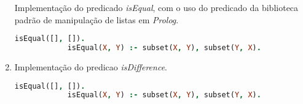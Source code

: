 \documentclass{article}
\begin{document}
\begin{enumerate}
        Implementação do predicado \textit{isEqual}, com o uso do predicado da biblioteca padrão de manipulação
        de listas em \textit{Prolog}.

        \begin{lstlisting}[language=Prolog]
            isEqual([], []).
            isEqual(X, Y) :- subset(X, Y), subset(Y, X).
        \end{lstlisting}

    \item 

        Implementação do predicao \textit{isDifference}.

        \begin{lstlisting}[language=Prolog]
            isEqual([], []).
            isEqual(X, Y) :- subset(X, Y), subset(Y, X).
        \end{lstlisting}

\end{enumerate}
    
\end{document}
